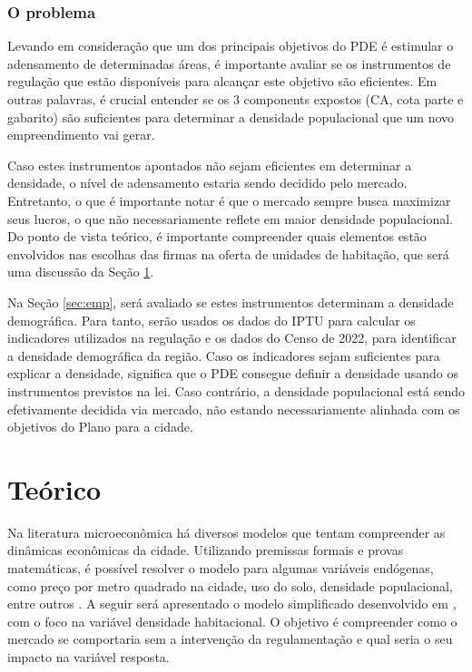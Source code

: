 \subsection*{\textbf{O problema}}

Levando em consideração que um dos principais objetivos do PDE é estimular o adensamento de determinadas áreas, é importante avaliar se os instrumentos de regulação que estão disponíveis para alcançar este objetivo são eficientes. Em outras palavras, é crucial entender se os 3 components expostos (CA, cota parte e gabarito) são suficientes para determinar a densidade populacional que um novo empreendimento vai gerar. 

Caso estes instrumentos apontados não sejam eficientes em determinar a densidade, o nível de adensamento estaria sendo decidido pelo mercado. Entretanto, o que é importante notar é que o mercado sempre busca maximizar seus lucros, o que não necessariamente reflete em maior densidade populacional. Do ponto de vista teórico, é importante compreender quais elementos estão envolvidos nas escolhas das firmas na oferta de unidades de habitação, que será uma discussão da Seção \ref{sec:micro}.

Na Seção \ref{sec:emp}, será avaliado se estes instrumentos determinam a densidade demográfica. Para tanto, serão usados os dados do IPTU para calcular os indicadores utilizados na regulação e os dados do Censo de 2022, para identificar a densidade demográfica da região. Caso os indicadores sejam suficientes para explicar a densidade, significa que o PDE consegue definir a densidade usando os instrumentos previstos na lei. Caso contrário, a densidade populacional está sendo efetivamente decidida via mercado, não estando necessariamente alinhada com os objetivos do Plano para a cidade.

\chapter{Teórico}
\label{sec:micro}

Na literatura microeconômica há diversos modelos que tentam compreender as dinâmicas econômicas da cidade. Utilizando premissas formais e provas matemáticas, é possível resolver o modelo para algumas variáveis endógenas, como preço por metro quadrado na cidade, uso do solo, densidade populacional, entre outros \cite{papageorgiou2012essay, fujita1989urban}. A seguir será apresentado o modelo simplificado desenvolvido em \cite{brueckner2011lectures}, com o foco na variável densidade habitacional. O objetivo é compreender como o mercado se comportaria sem a intervenção da regulamentação e qual seria o seu impacto na variável resposta.


